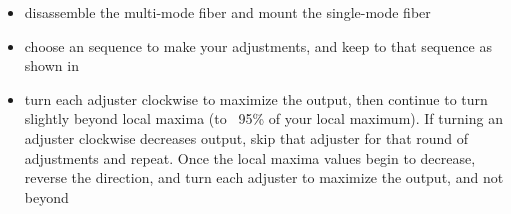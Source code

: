 \begin{itemize}
  \item disassemble the multi-mode fiber and mount the single-mode fiber
  \item choose an sequence to make your adjustments, and keep to that sequence as shown in 
  \item turn each adjuster clockwise to maximize the output, then continue to turn slightly beyond local maxima (to ~95\% of your local maximum). If turning an adjuster clockwise decreases output, skip that adjuster for that round of adjustments and repeat. Once the local maxima values begin to decrease, reverse the direction, and turn each adjuster to maximize the output, and not beyond
\end{itemize}
